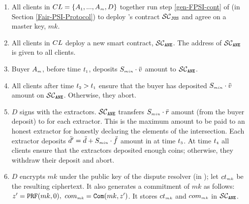 \begin{enumerate}[leftmargin=4mm]


\item\label{e-psi::call-F-PSI-stepOne}  All clients in ${CL}=\{ A_{\scriptscriptstyle 1},...,   A_{\scriptscriptstyle m},  D\}$ together run step \ref{gen-FPSI-cont} of \fpsi (in Section \ref{Fair-PSI-Protocol}) to deploy \fpsi's contract $\mathcal{SC}_{\mathtt{JUS}}$ and agree on a  master key, $mk$. 

\item\label{e-psi::deploy-SC-E-PSI} All clients in ${CL}$  deploy a new smart contract, $\mathcal{SC}_{\mathtt{ANE}}$. The address of $\mathcal{SC}_{\mathtt{ANE}}$ is given to all clients. 

\item Buyer $ { A}_{\scriptscriptstyle {  m}}$, before time $t_{\scriptscriptstyle 1}$, deposits $S_{\scriptscriptstyle min}\cdot \ddot{v}$  amount to $\mathcal{SC}_{\mathtt{ANE}}$. 
\item\label{e-PSI::buyer-deposit} All clients after  time $t_{\scriptscriptstyle 2}>t_{\scriptscriptstyle 1}$ ensure that the buyer has deposited $S_{\scriptscriptstyle min}\cdot \ddot{v}$ amount on $\mathcal{SC}_{\mathtt{ANE}}$. Otherwise, they abort.



\item\label{e-PSI::extractor-deposit} $D$ signs \SCpc with the extractors. $\mathcal{SC}_{\mathtt{ANE}}$ transfers $S_{\scriptscriptstyle min}\cdot \ddot{r}$ amount (from the buyer deposit) to \SCpc for each extractor. This is the maximum amount to be paid to an honest extractor for honestly declaring the elements of the intersection. %
%
Each extractor  deposits $\ddot{d}'=\ddot{d}+S_{\scriptscriptstyle min}\cdot \ddot{f}$ amount in \SCpc at time $t_{\scriptscriptstyle 3}$. At time $t_{\scriptscriptstyle 4}$ all clients ensure that the extractors deposited enough coins; otherwise, they withdraw their deposit and abort. 

%
\item\label{e-psi::commit-to-mk} $D$ encrypts $mk$ under the public key of the dispute resolver (in \SCpc); let $ct_{\scriptscriptstyle mk}$ be the resulting ciphertext.  It also generates a commitment of $mk$ as follows: $z'=\mathtt{PRF}(mk, 0),\ com_{\scriptscriptstyle mk}=\mathtt{Com}(mk, z')$. It stores $ct_{\scriptscriptstyle mk}$  and ${com}_{\scriptscriptstyle mk}$ in $\mathcal{SC}_{\mathtt{ANE}}$. 



\end{enumerate}
